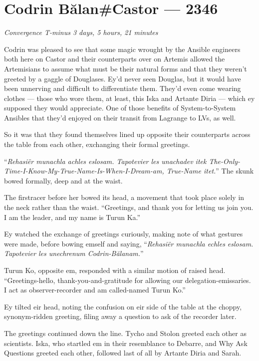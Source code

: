 \hypertarget{codrin-bux103lancastor-2346}{%
\chapter{Codrin Bălan\#Castor — 2346}\label{codrin-bux103lancastor-2346}}

\begin{center}
\emph{Convergence T-minus 3 days, 5 hours, 21 minutes}
\end{center}

\noindent Codrin was pleased to see that some magic wrought by the Ansible engineers both here on Castor and their counterparts over on Artemis allowed the Artemisians to assume what must be their natural forms and that they weren't greeted by a gaggle of Douglases. Ey'd never seen Douglas, but it would have been unnerving and difficult to differentiate them. They'd even come wearing clothes — those who wore them, at least, this Iska and Artante Diria — which ey supposed they would appreciate. One of those benefits of System-to-System Ansibles that they'd enjoyed on their transit from Lagrange to LVs, as well.

So it was that they found themselves lined up opposite their counterparts across the table from each other, exchanging their formal greetings.

``\emph{Rehasiër munachla achles eslosam. Tapotevier les unachadev itek The-Only-Time-I-Know-My-True-Name-Is-When-I-Dream-am, True-Name itet.}'' The skunk bowed formally, deep and at the waist.

The firstracer before her bowed its head, a movement that took place solely in the neck rather than the waist. ``Greetings, and thank you for letting us join you. I am the leader, and my name is Turun Ka.''

Ey watched the exchange of greetings curiously, making note of what gestures were made, before bowing emself and saying, ``\emph{Rehasiër munachla echles eslosam. Tapotevier les unechrenum Codrin-Bălanam.}''

Turun Ko, opposite em, responded with a similar motion of raised head. ``Greetings-hello, thank-you-and-gratitude for allowing our delegation-emissaries. I act as observer-recorder and am called-named Turun Ko.''

Ey tilted eir head, noting the confusion on eir side of the table at the choppy, synonym-ridden greeting, filing away a question to ask of the recorder later.

The greetings continued down the line. Tycho and Stolon greeted each other as scientists. Iska, who startled em in their resemblance to Debarre, and Why Ask Questions greeted each other, followed last of all by Artante Diria and Sarah.

